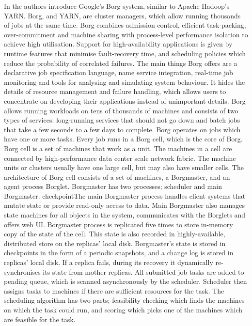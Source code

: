 \documentclass{article}
\theoremstyle{definition}
\begin{document}
In \cite{Verma} the authors introduce Google's Borg system, similar to Apache Hadoop's YARN. Borg, and YARN, are cluster managers, which allow running thousands of jobs at the same time. Borg combines admission control, efficient task-packing, over-commitment and machine sharing with process-level performance isolation to achieve high utilisation. Support for high-availability applications is given by runtime features that minimise fault-recovery time, and scheduling policies which reduce the probability of correlated failures. The main things Borg offers are a declarative job specification language, name service integration, real-time job monitoring and tools for analysing and simulating system behaviour. It hides the details of resource management and failure handling, which allows users to concentrate on developing their applications instead of unimportant details. Borg allows running workloads on tens of thousands of machines and consists of two types of services: long-running services that should not go down and batch jobs that take a few seconds to a few days to complete. 
Borg operates on jobs which have one or more tasks. Every job runs in a Borg cell, which is the core of Borg. Borg cell is a set of machines that work as a unit. The machines in a cell are connected by high-performance data center scale network fabric. The machine units or clusters usually have one large cell, but may also have smaller cells. The architecture of Borg cell consists of a set of machines, a Borgmaster, and an agent process Borglet. Borgmaster has two processes; scheduler and main Borgmaster. checkpointThe main Borgmaster process handles client systems that mutate state or provide read-only access to data. Main Borgmaster also manages state machines for all objects in the system, communicates with the Borglets and offers web UI. Borgmaster process is replicated five times to store in-memory copy of the state of the cell. This state is also recorded in highly-available, distributed store on the replicas' local disk. Borgmaster's state is stored in checkpoints in the form of a periodic snapshots, and a change log is stored in replicas' local disk. If a replica fails, during its recovery it dynamically re-synchronises its state from mother replicas.
All submitted job tasks are added to pending queue, which is scanned asynchronously by the scheduler. Scheduler then assigns tasks to machines if there are sufficient resources for the task. The scheduling algorithm has two parts; feasibility checking which finds the machines on which the task could run, and scoring which picks one of the machines which are feasible for the task.
\end{document}

